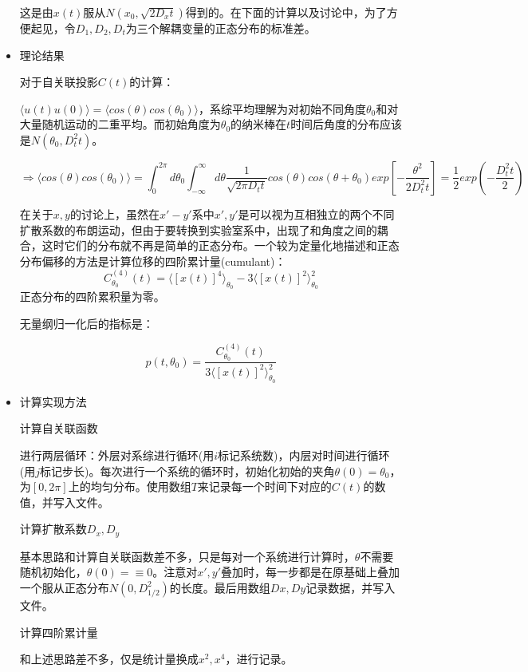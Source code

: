 \documentclass[UTF8]{ctexart}
\begin{document}
\begin{itemize}
	这是由$x(t)$服从$N(x_0,\sqrt{2D_xt})$得到的。在下面的计算以及讨论中，为了方便起见，令$D_1,D_2,D_t$为三个解耦变量的正态分布的标准差。
	
	
	
	\item 理论结果
	
	对于自关联投影$C(t)$的计算：
	
	$\langle u(t)u(0) \rangle=\langle cos(\theta)cos(\theta_0) \rangle$，系综平均理解为对初始不同角度$\theta_0$和对大量随机运动的二重平均。而初始角度为$\theta_0$的纳米棒在$t$时间后角度的分布应该是$N(\theta_0,D^2_t t)$。
	
	$$\Rightarrow \langle cos(\theta)cos(\theta_0) \rangle=\int_{0}^{2\pi}d\theta_0\int_{-\infty}^{\infty}d\theta\frac{1}{\sqrt{2\pi {D_t} t}}cos(\theta) cos(\theta+\theta_0)exp[-\frac{\theta^2}{2D^2_t t}]=\frac{1}{2}exp(-\frac{D^2_t t}{2})$$
	
	在关于$x,y$的讨论上，虽然在$x'-y'$系中$x',y'$是可以视为互相独立的两个不同扩散系数的布朗运动，但由于要转换到实验室系中，出现了和角度之间的耦合，这时它们的分布就不再是简单的正态分布。一个较为定量化地描述和正态分布偏移的方法是计算位移的四阶累计量(cumulant)\cite{ref1}：
	$$C_{\theta_0}^{(4)}(t)=\langle [x(t)]^4 \rangle_{\theta_0}-3\langle [x(t)]^2 \rangle_{\theta_0}^2$$
	正态分布的四阶累积量为零。
	
	
	无量纲归一化后的指标是：
	
	$$p(t,\theta_0)=\frac{C_{\theta_0}^{(4)}(t)}{3\langle [x(t)]^2 \rangle_{\theta_0}^2}$$
	
	
	\item 计算实现方法
	
	\subitem 计算自关联函数
	
	进行两层循环：外层对系综进行循环(用$i$标记系统数)，内层对时间进行循环(用$j$标记步长)。每次进行一个系统的循环时，初始化初始的夹角$\theta(0)=\theta_0$，为$[0,2\pi]$上的均匀分布。使用数组$T$来记录每一个时间下对应的$C(t)$的数值，并写入文件。
	
	\subitem 计算扩散系数$D_x,D_y$

	基本思路和计算自关联函数差不多，只是每对一个系统进行计算时，$\theta$不需要随机初始化，$\theta(0)=\equiv0$。注意对$x',y'$叠加时，每一步都是在原基础上叠加一个服从正态分布$N(0,D_{1/2}^2)$的长度。最后用数组$Dx,Dy$记录数据，并写入文件。
	
	\subitem 计算四阶累计量
	
	和上述思路差不多，仅是统计量换成$x^2,x^4$，进行记录。
	


	\end{itemize}
\end{document}
